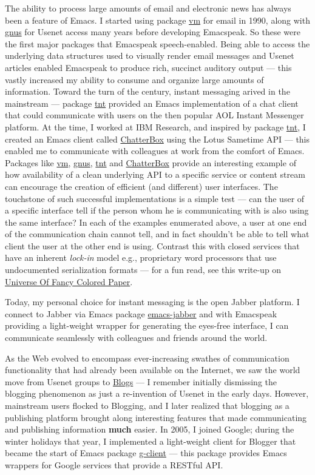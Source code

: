 \documentclass[11pt]{article}
\begin{document}
The ability to process large amounts of email and electronic news
has always been a feature of Emacs. I started using package \uline{vm}
for email in 1990, along with \uline{gnus} for Usenet access many years
before developing Emacspeak. So these were the first major
packages that Emacspeak speech-enabled. Being able to access the
underlying data structures used to visually render email messages
and Usenet articles enabled Emacspeak to produce rich, succinct
auditory output — this vastly increased my ability to consume and
organize large amounts of information. Toward the turn of the
century, instant messaging arived in the mainstream — package
\uline{tnt} provided an Emacs implementation of a chat client that
could communicate with users on the then popular AOL Instant
Messenger platform. At the time, I worked at IBM Research, and
inspired by package \uline{tnt}, I created an Emacs client called
\uline{ChatterBox} using the Lotus Sametime API — this enabled me to
communicate with colleagues at work from the comfort of
Emacs. Packages like \uline{vm}, \uline{gnus}, \uline{tnt} and \uline{ChatterBox} provide
an interesting example of how availability of a clean underlying
API to a specific service or content stream can encourage the
creation of efficient (and different) user interfaces. The
touchstone of such successful implementations is a simple test —
can the user of a specific interface tell if the person whom he
is communicating with is also using the same interface? In each
of the examples enumerated above, a user at one end of the
communication chain cannot tell, and in fact shouldn't be able to
tell what client the user at the other end is using. Contrast
this with closed services that have an inherent \emph{lock-in} model
e.g., proprietary word processors that use undocumented
serialization formats — for a fun read, see this write-up on
\href{http://emacspeak.sourceforge.net/publications/colored-paper.html}{Universe Of Fancy Colored Paper}.


Today, my personal choice for instant messaging is the open
Jabber platform. I connect to Jabber via Emacs package
\uline{emacs-jabber} and with Emacspeak providing a light-weight
wrapper for generating the eyes-free interface, I can communicate
seamlessly with colleagues and friends around the world.

As the Web evolved to encompass ever-increasing swathes of
communication functionality that had already been available on
the Internet, we saw the world move from Usenet groups to \uline{Blogs}
— I remember initially dismissing the blogging phenomenon as just
a re-invention of Usenet in the early days. However, mainstream
users flocked to Blogging, and I later realized that blogging as
a publishing platform brought along interesting features that
made communicating and publishing information \textbf{much} easier. In
2005, I joined Google; during the winter holidays that year, I
implemented a light-weight client for Blogger that became the
start of Emacs package \uline{g-client} — this package provides Emacs
wrappers for Google services that provide a RESTful API.
\end{document}
